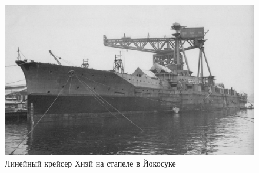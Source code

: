 \begin{figure}[h!tb] 
	\centering\includegraphics[scale=0.2]{Glava3/JWJxkm_fvXQ.jpg}
	\caption{Линейный крейсер Хиэй на стапеле в Йокосуке}%
\end{figure}

